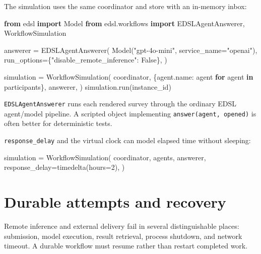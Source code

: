\documentclass[
  10pt,
]{report}
\newenvironment{Shaded}{}{}
\newcommand{\ControlFlowTok}[1]{\textcolor[rgb]{0.00,0.44,0.13}{\textbf{#1}}}
\newcommand{\DecValTok}[1]{\textcolor[rgb]{0.25,0.63,0.44}{#1}}
\newcommand{\ImportTok}[1]{\textcolor[rgb]{0.00,0.50,0.00}{\textbf{#1}}}
\newcommand{\KeywordTok}[1]{\textcolor[rgb]{0.00,0.44,0.13}{\textbf{#1}}}
\newcommand{\NormalTok}[1]{#1}
\newcommand{\OperatorTok}[1]{\textcolor[rgb]{0.40,0.40,0.40}{#1}}
\newcommand{\StringTok}[1]{\textcolor[rgb]{0.25,0.44,0.63}{#1}}
\newcommand{\VariableTok}[1]{\textcolor[rgb]{0.10,0.09,0.49}{#1}}
\begin{document}
The simulation uses the same coordinator and store with an in-memory
inbox:

\begin{Shaded}
\begin{Highlighting}[]
\ImportTok{from}\NormalTok{ edsl }\ImportTok{import}\NormalTok{ Model}
\ImportTok{from}\NormalTok{ edsl.workflows }\ImportTok{import}\NormalTok{ EDSLAgentAnswerer, WorkflowSimulation}

\NormalTok{answerer }\OperatorTok{=}\NormalTok{ EDSLAgentAnswerer(}
\NormalTok{    Model(}\StringTok{"gpt{-}4o{-}mini"}\NormalTok{, service\_name}\OperatorTok{=}\StringTok{"openai"}\NormalTok{),}
\NormalTok{    run\_options}\OperatorTok{=}\NormalTok{\{}\StringTok{"disable\_remote\_inference"}\NormalTok{: }\VariableTok{False}\NormalTok{\},}
\NormalTok{)}

\NormalTok{simulation }\OperatorTok{=}\NormalTok{ WorkflowSimulation(}
\NormalTok{    coordinator,}
\NormalTok{    \{agent.name: agent }\ControlFlowTok{for}\NormalTok{ agent }\KeywordTok{in}\NormalTok{ participants\},}
\NormalTok{    answerer,}
\NormalTok{)}
\NormalTok{simulation.run(instance\_id)}
\end{Highlighting}
\end{Shaded}

\texttt{EDSLAgentAnswerer} runs each rendered survey through the
ordinary EDSL agent/model pipeline. A scripted object implementing
\texttt{answer(agent,\ opened)} is often better for deterministic tests.

\texttt{response\_delay} and the virtual clock can model elapsed time
without sleeping:

\begin{Shaded}
\begin{Highlighting}[]
\NormalTok{simulation }\OperatorTok{=}\NormalTok{ WorkflowSimulation(}
\NormalTok{    coordinator,}
\NormalTok{    agents,}
\NormalTok{    answerer,}
\NormalTok{    response\_delay}\OperatorTok{=}\NormalTok{timedelta(hours}\OperatorTok{=}\DecValTok{2}\NormalTok{),}
\NormalTok{)}
\end{Highlighting}
\end{Shaded}

\chapter{Durable attempts and
recovery}\label{durable-attempts-and-recovery}

Remote inference and external delivery fail in several distinguishable
places: submission, model execution, result retrieval, process shutdown,
and network timeout. A durable workflow must resume rather than restart
completed work.
\end{document}
